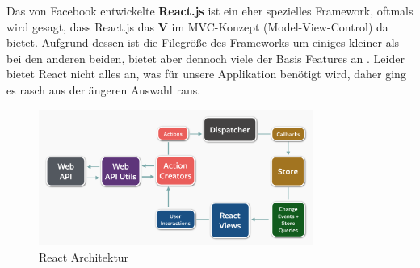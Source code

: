 Das von Facebook entwickelte \textbf{React.js} ist ein eher spezielles Framework, oftmals wird gesagt, dass React.js das \textbf{V} im MVC-Konzept (Model-View-Control) da bietet. Aufgrund dessen ist die Filegröße des Frameworks um einiges kleiner als bei den anderen beiden, bietet aber dennoch viele der Basis Features an \cite{MELD.CH3-web-app.react}. Leider bietet React nicht alles an, was für unsere Applikation benötigt wird, daher ging es rasch aus der ängeren Auswahl raus.

\begin{figure}[!htb]\centering
	\includegraphics[width=0.8\textwidth]{images/react}
	\caption{React Architektur \cite{MELD.CH3-web-app.react}}
\end{figure}

\clearpage